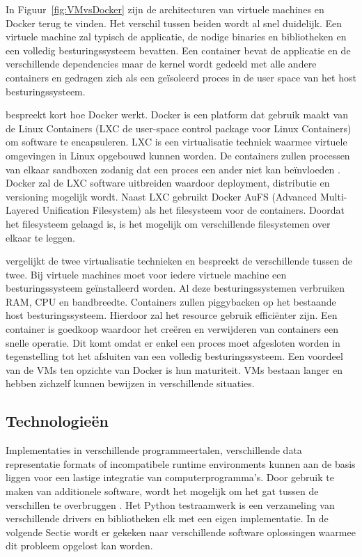 In Figuur~\vref{fig:VMvsDocker} zijn de architecturen van virtuele machines en Docker terug te vinden.
Het verschil tussen beiden wordt al snel duidelijk.
Een virtuele machine zal typisch de applicatie, de nodige binaries en bibliotheken en een volledig besturingssysteem bevatten.
Een container bevat de applicatie en de verschillende dependencies maar de kernel wordt gedeeld met alle andere containers en gedragen zich als een geïsoleerd proces in de user space van het host besturingssysteem.

\citet{chamberlain2014using} bespreekt kort hoe Docker werkt.
Docker is een platform dat gebruik maakt van de Linux Containers (LXC de user-space control package voor Linux Containers) om software te encapsuleren.
LXC is een virtualisatie techniek waarmee virtuele omgevingen in Linux opgebouwd kunnen worden.
De containers zullen processen van elkaar sandboxen zodanig dat een proces een ander niet kan beïnvloeden \citep{merkel2014docker}.
Docker zal de LXC software uitbreiden waardoor deployment, distributie en versioning mogelijk wordt.
Naast LXC gebruikt Docker AuFS (Advanced Multi-Layered Unification Filesystem) als het filesysteem voor de containers.
Doordat het filesysteem gelaagd is, is het mogelijk om verschillende filesystemen over elkaar te leggen.

\citet{merkel2014docker} vergelijkt de twee virtualisatie technieken en bespreekt de verschillende tussen de twee.
Bij virtuele machines moet voor iedere virtuele machine een besturingssysteem geïnstalleerd worden.
Al deze besturingssystemen verbruiken RAM, CPU en bandbreedte.
Containers zullen piggybacken op het bestaande host besturingssysteem.
Hierdoor zal het resource gebruik efficiënter zijn.
Een container is goedkoop waardoor het creëren en verwijderen van containers een snelle operatie.
Dit komt omdat er enkel een proces moet afgesloten worden in tegenstelling tot het afsluiten van een volledig besturingssysteem.
Een voordeel van de VMs ten opzichte van Docker is hun maturiteit.
VMs bestaan langer en hebben zichzelf kunnen bewijzen in verschillende situaties.

\subsection{Technologieën}\label{sec:technologieen}
Implementaties in verschillende programmeertalen, verschillende data representatie formats of incompatibele runtime environments kunnen aan de basis liggen voor een lastige integratie van computerprogramma's.
Door gebruik te maken van additionele software, wordt het mogelijk om het gat tussen de verschillen te overbruggen  \citep{callahan1998software}.
Het Python testraamwerk is een verzameling van verschillende drivers en bibliotheken elk met een eigen implementatie.
In de volgende Sectie wordt er gekeken naar verschillende software oplossingen waarmee dit probleem opgelost kan worden.

